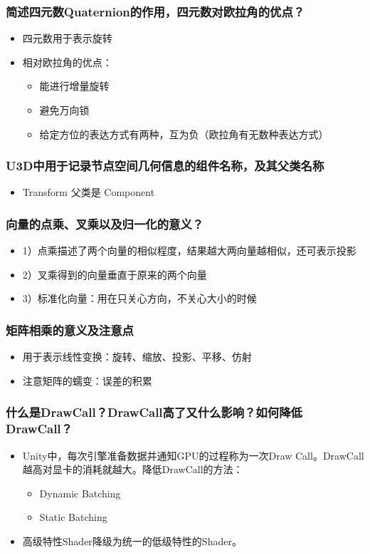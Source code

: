 \documentclass[9pt, b5paper]{article}
\begin{document}
\subsubsection{简述四元数Quaternion的作用，四元数对欧拉角的优点？}
\label{sec:org2ff9601}
\begin{itemize}
\item 四元数用于表示旋转
\item 相对欧拉角的优点：
\begin{itemize}
\item 能进行增量旋转
\item 避免万向锁
\item 给定方位的表达方式有两种，互为负（欧拉角有无数种表达方式）
\end{itemize}
\end{itemize}

\subsubsection{U3D中用于记录节点空间几何信息的组件名称，及其父类名称}
\label{sec:org8bfc2f8}
\begin{itemize}
\item Transform 父类是 Component
\end{itemize}
\subsubsection{向量的点乘、叉乘以及归一化的意义？}
\label{sec:orgd81db7f}
\begin{itemize}
\item 1）点乘描述了两个向量的相似程度，结果越大两向量越相似，还可表示投影
\item 2）叉乘得到的向量垂直于原来的两个向量
\item 3）标准化向量：用在只关心方向，不关心大小的时候
\end{itemize}
\subsubsection{矩阵相乘的意义及注意点}
\label{sec:org09976db}
\begin{itemize}
\item 用于表示线性变换：旋转、缩放、投影、平移、仿射
\item 注意矩阵的蠕变：误差的积累
\end{itemize}

\subsubsection{什么是DrawCall？DrawCall高了又什么影响？如何降低DrawCall？}
\label{sec:org1453f54}
\begin{itemize}
\item Unity中，每次引擎准备数据并通知GPU的过程称为一次Draw Call。DrawCall越高对显卡的消耗就越大。降低DrawCall的方法：
\begin{itemize}
\item Dynamic Batching
\item Static Batching
\end{itemize}
\item 高级特性Shader降级为统一的低级特性的Shader。
\end{itemize}
\end{document}
